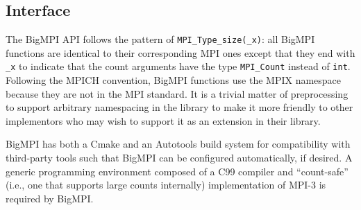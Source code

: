 
\subsection{Interface}

The BigMPI API follows the pattern of \texttt{MPI\_Type\_size(\_x)}: 
all BigMPI functions are identical to their corresponding MPI ones except that
they end with \texttt{\_x} to indicate that the count arguments have the type
\texttt{MPI\_Count} instead of \texttt{int}.
Following the MPICH convention, BigMPI functions use the 
MPIX namespace because they are not in the MPI standard.
It is a trivial matter of preprocessing to support arbitrary namespacing
in the library to make it more friendly to other implementors who
may wish to support it as an extension in their library.


BigMPI has both a Cmake and an Autotools build system for compatibility
with third-party tools such that BigMPI can be configured automatically, if desired.
A generic programming environment composed of a C99 compiler 
and ``count-safe'' (i.e.,  one that supports large counts internally) 
implementation of MPI-3 is required by BigMPI.
